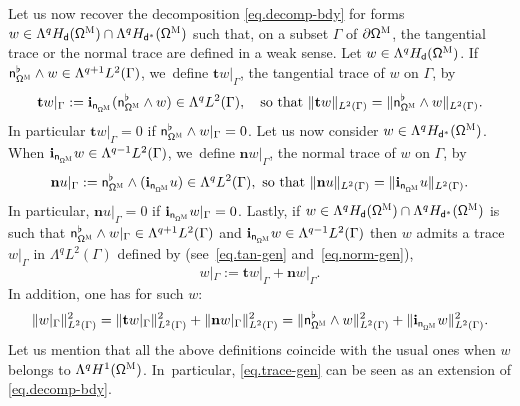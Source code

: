 \documentclass[10pt]{amsart}
\newcommand{\mbf}[1]{\mathbf{#1}}
\let\pa\partial
\theoremstyle{plain}
\theoremstyle{definition}
\begin{document}
Let us now recover the decomposition \eqref{eq.decomp-bdy} for forms
$w\in \Lambda^q H_{\mathsf d} (\mathsf \Omega^{\textsc{M}})\cap
\Lambda^q H_{\mathsf d^*} (\mathsf \Omega^{\textsc{M}})$ such that,
on a subset $\Gamma$ of $\pa \mathsf \Omega^{\textsc{M}} $, the
tangential trace or the normal trace are defined in a weak sense.
Let $w\in \Lambda^q H_{\mathsf d} (\mathsf \Omega^{\textsc{M}})$. If~$ \mathsf n_{\mathsf \Omega^{\textsc{M}}}^\flat \wedge w \in
\Lambda^{q+1} L^2 (\Gamma)$, we~define $\mbf tw|_\Gamma$, the tangential trace of $w$ on $\Gamma$, by
\begin{equation}
\label{eq.tan-gen}\mathbf t w|_{\Gamma}:= \mathbf{i}_{\mathsf n_{\mathsf \Omega^{\textsc{M}} }}
(\mathsf n_{\mathsf \Omega^{\textsc{M}} }^{\flat} \wedge w) \in \Lambda^{q} L^2(\Gamma),\quad\text{so that } \|\mathbf t w\|_{ L^2(\Gamma)} = \|\mathsf n_{\mathsf \Omega^{\textsc{M}} }^{\flat} \wedge w\|_{ L^2(\Gamma)}.
\end{equation}
In particular $\mbf tw|_\Gamma=0$ if $ \mathsf n_{\mathsf \Omega^{\textsc{M}}}^\flat \wedge w|_\Gamma=0$.
Let us now consider $w \in \Lambda^q H_{\mathsf d^*} (\mathsf \Omega^{\textsc{M}})$.
When $ \mathbf{i}_{\mathsf n_{\mathsf \Omega^{\textsc{M}}}} w\in
\Lambda^{q-1} L^2 (\Gamma)$, we~define $\mbf nw|_\Gamma$, the
normal trace of $w$ on $\Gamma$, by
\begin{equation}
\label{eq.norm-gen}\mathbf n u|_{\Gamma}:= \mathsf n_{\mathsf \Omega^{\textsc{M}} }^{\flat} \wedge
(\mathbf{i}_{\mathsf n_{\mathsf \Omega^{\textsc{M}} }}u) \in \Lambda^{q} L^2(\Gamma), \text{
so that } \|\mathbf n u\|_{ L^2(\Gamma)}
=\|\mathbf{i}_{\mathsf n_{\mathsf \Omega^{\textsc{M}} }}u\|_{ L^2(\Gamma)}.
\end{equation}
In particular, $\mathbf n u|_{\Gamma} =0$ if $ \mathbf{i}_{\mathsf n_{\mathsf \Omega^{\textsc{M}}}} w|_\Gamma=0$.
Lastly, if $w\in \Lambda^qH_{\mathsf d}(\mathsf \Omega^{\textsc{M}})\cap \Lambda^qH_{\mathsf d^*}(\mathsf \Omega^{\textsc{M}})$ is such that $\mathsf n_{\mathsf \Omega^{\textsc{M}} }^{\flat}\wedge w|_{\Gamma}\in \Lambda^{q+1}L^2(\Gamma)$ and $\mathbf{i}_{\mathsf n_{\mathsf \Omega^{\textsc{M}} }}w\in \Lambda^{q-1}L^2(\Gamma)$ then $w$ admits a trace $w|_{\Gamma}$ in $\Lambda^qL^2(\Gamma)$ defined by (see~\eqref{eq.tan-gen} and~\eqref{eq.norm-gen}),
\begin{equation}
\label{eq.trace-gen}
w|_{\Gamma}:= \mathbf tw|_{\Gamma}+
\mathbf n w|_{\Gamma}.
\end{equation}
In addition, one has for such $w$:
\[
\|w|_{\Gamma}\|^2_{ L^2(\Gamma)} =
\| \mathbf t w|_{\Gamma}\|^2_{ L^2(\Gamma)}
+
\|\mathbf n w|_{\Gamma}\|^2_{ L^2(\Gamma)}
=
\|\mathsf n_{\mathsf \Omega^{\textsc{M}} }^{\flat} \wedge w\|_{ L^2(\Gamma)}^2
+
\|\mathbf{i}_{\mathsf n_{\mathsf \Omega^{\textsc{M}} }}w\|_{ L^2(\Gamma)}^2.
\]
Let us mention that all the above definitions coincide
with the usual ones when $w$ belongs to $\Lambda^q H^1 (\mathsf \Omega^{\textsc{M}})$. In~particular, \eqref{eq.trace-gen} can be seen as an extension of \eqref{eq.decomp-bdy}.
\end{document}
